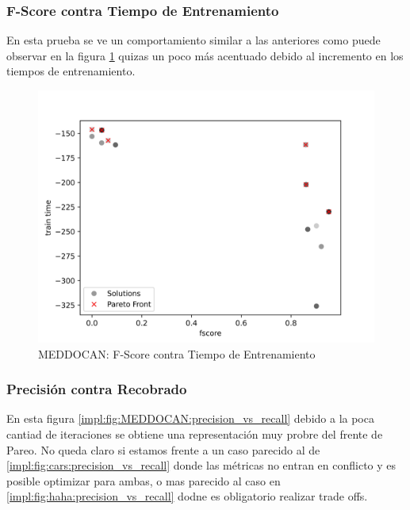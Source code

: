 \subsubsection{F-Score contra Tiempo de Entrenamiento}

En esta prueba se ve un comportamiento similar a las anteriores como puede observar en la figura  \ref{impl:fig:MEDDOCAN:fscore_vs_train_time} quizas un poco m\'as acentuado debido al incremento en los tiempos de entrenamiento.

\begin{figure}[ht]
    \centering
    \includegraphics[scale=0.65]{Pictures/meddocan_fscore_vs_train.jpg}
    \caption{MEDDOCAN: F-Score contra Tiempo de Entrenamiento}
    \label{impl:fig:MEDDOCAN:fscore_vs_train_time}
\end{figure}


\subsubsection{Precisi\'on contra Recobrado}

En esta figura \ref{impl:fig:MEDDOCAN:precision_vs_recall} debido a la poca cantiad de iteraciones se obtiene una representaci\'on muy probre del frente de Pareo. No queda claro si estamos frente a un caso parecido al de \ref{impl:fig:cars:precision_vs_recall} donde las m\'etricas no entran en conflicto y es posible optimizar para ambas, o mas parecido al caso en \ref{impl:fig:haha:precision_vs_recall} dodne es obligatorio realizar trade offs.

